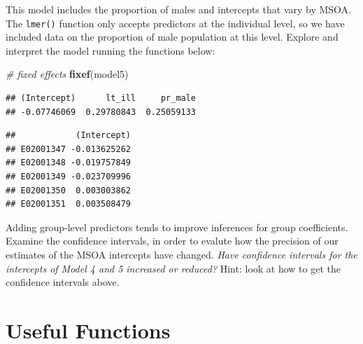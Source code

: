 \documentclass[]{book}
\newenvironment{Shaded}{\begin{snugshade}}{\end{snugshade}}
\newcommand{\KeywordTok}[1]{\textcolor[rgb]{0.13,0.29,0.53}{\textbf{#1}}}
\newcommand{\DecValTok}[1]{\textcolor[rgb]{0.00,0.00,0.81}{#1}}
\newcommand{\StringTok}[1]{\textcolor[rgb]{0.31,0.60,0.02}{#1}}
\newcommand{\CommentTok}[1]{\textcolor[rgb]{0.56,0.35,0.01}{\textit{#1}}}
\newcommand{\OperatorTok}[1]{\textcolor[rgb]{0.81,0.36,0.00}{\textbf{#1}}}
\newcommand{\NormalTok}[1]{#1}
\begin{document}
This model includes the proportion of males and intercepts that vary by
MSOA. The \texttt{lmer()} function only accepts predictors at the
individual level, so we have included data on the proportion of male
population at this level. Explore and interpret the model running the
functions below:

\begin{Shaded}
\begin{Highlighting}[]
\CommentTok{# fixed effects}
\KeywordTok{fixef}\NormalTok{(model5)}
\end{Highlighting}
\end{Shaded}

\begin{verbatim}
## (Intercept)      lt_ill     pr_male 
## -0.07746069  0.29780843  0.25059133
\end{verbatim}

\begin{Shaded}
\end{Shaded}

\begin{verbatim}
##            (Intercept)
## E02001347 -0.013625262
## E02001348 -0.019757849
## E02001349 -0.023709996
## E02001350  0.003003862
## E02001351  0.003508479
\end{verbatim}

Adding group-level predictors tends to improve inferences for group
coefficients. Examine the confidence intervals, in order to evalute how
the precision of our estimates of the MSOA intercepts have changed.
\emph{Have confidence intervals for the intercepts of Model 4 and 5
increased or reduced?} Hint: look at how to get the confidence intervals
above.

\section{Useful Functions}\label{useful-functions-1}
\end{document}
